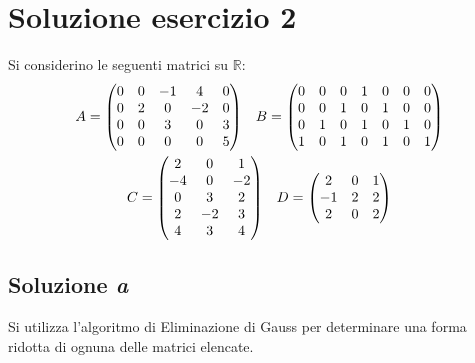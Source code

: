 \documentclass[a4paper]{article}
\makeatletter
\newenvironment{rowequmat}[1]{\left(\array{@{}#1@{}}}{\endarray\right)}
\makeatother
\begin{document}
	\section{Soluzione esercizio 2}
	
	Si considerino le seguenti matrici su $\mathbb{R}$:
	\begin{gather*}
		A = \begin{rowequmat}{ccccc}
			0 & 0 & -1 & 4 & 0 \\
			0 & 2 & 0 & -2 & 0 \\
			0 & 0 & 3 & 0 & 3 \\
			0 & 0 & 0 & 0 & 5
		\end{rowequmat} \hspace{1em}
		B = \begin{rowequmat}{ccccccc}
			0 & 0 & 0 & 1 & 0 & 0 & 0 \\
			0 & 0 & 1 & 0 & 1 & 0 & 0 \\
			0 & 1 & 0 & 1 & 0 & 1 & 0 \\
			1 & 0 & 1 & 0 & 1 & 0 & 1
		\end{rowequmat} \\
		C = \begin{rowequmat}{ccc}
			2 & 0 & 1 \\
			-4 & 0 & -2 \\
			0 & 3 & 2 \\
			2 & -2 & 3 \\
			4 & 3 & 4
		\end{rowequmat} \hspace{1em}
		D = \begin{rowequmat}{ccc}
			2 & 0 & 1 \\
			-1 & 2 & 2 \\
			2 & 0 & 2
		\end{rowequmat}
	\end{gather*}
	
	\subsection{Soluzione \emph{a}}
	
	Si utilizza l'algoritmo di Eliminazione di Gauss per determinare una forma ridotta di ognuna delle matrici elencate.
\end{document}
